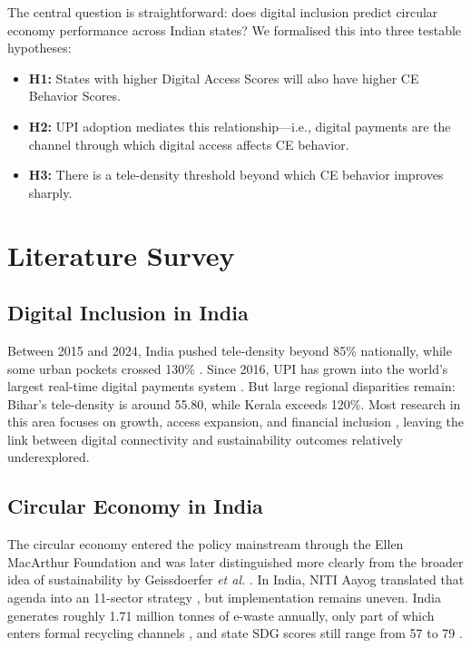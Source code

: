\documentclass[conference]{IEEEtran}
\begin{document}
The central question is straightforward: does digital inclusion predict circular economy performance across Indian states? We formalised this into three testable hypotheses:

\begin{itemize}
    \item \textbf{H1:} States with higher Digital Access Scores will also have higher CE Behavior Scores.
    \item \textbf{H2:} UPI adoption mediates this relationship---i.e., digital payments are the channel through which digital access affects CE behavior.
    \item \textbf{H3:} There is a tele-density threshold beyond which CE behavior improves sharply.
\end{itemize}

\section{Literature Survey}

\subsection{Digital Inclusion in India}

Between 2015 and 2024, India pushed tele-density beyond 85\% nationally, while some urban pockets crossed 130\% \cite{trai2024}. Since 2016, UPI has grown into the world's largest real-time digital payments system \cite{npci2025}. But large regional disparities remain: Bihar's tele-density is around 55.80, while Kerala exceeds 120\%. Most research in this area focuses on growth, access expansion, and financial inclusion \cite{meity2023}, leaving the link between digital connectivity and sustainability outcomes relatively underexplored.

\subsection{Circular Economy in India}

The circular economy entered the policy mainstream through the Ellen MacArthur Foundation and was later distinguished more clearly from the broader idea of sustainability by Geissdoerfer \textit{et al.} \cite{emf2013,geissdoerfer2017}. In India, NITI Aayog translated that agenda into an 11-sector strategy \cite{nitiCE2021}, but implementation remains uneven. India generates roughly 1.71 million tonnes of e-waste annually, only part of which enters formal recycling channels \cite{cpcb2023}, and state SDG scores still range from 57 to 79 \cite{nitiSDG2024}.
\end{document}

